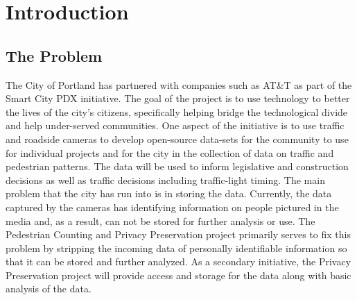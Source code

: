 \documentclass[onecolumn, draftclsnofoot,10pt, compsoc]{IEEEtran}
\begin{document}
\begin{titlepage}
\begin{singlespace}
\begin{abstract}
        \end{abstract}     
    \end{singlespace}
\end{titlepage}
\newpage
{}
\tableofcontents
\pagebreak

\section{Introduction}
\subsection{The Problem}
The City of Portland has partnered with companies such as AT\&T as part of the Smart City PDX initiative. The goal of the project is to use technology to better the lives of the city's citizens, specifically helping bridge the technological divide and help under-served communities. One aspect of the initiative is to use traffic and roadside cameras to develop open-source data-sets for the community to use for individual projects and for the city in the collection of data on traffic and pedestrian patterns. The data will be used to inform legislative and construction decisions as well as traffic decisions including traffic-light timing. The main problem that the city has run into is in storing the data. Currently, the data captured by the cameras has identifying information on people pictured in the media and, as a result, can not be stored for further analysis or use. The Pedestrian Counting and Privacy Preservation project primarily serves to fix this problem by stripping the incoming data of personally identifiable information so that it can be stored and further analyzed. As a secondary initiative, the Privacy Preservation project will provide access and storage for the data along with basic analysis of the data. 
\end{document}
